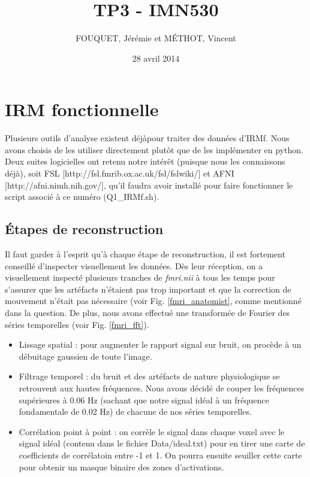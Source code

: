 \documentclass[a4paper]{article}
\title{TP3 - IMN530}
\author{FOUQUET, Jérémie et MÉTHOT, Vincent}
\date{28 avril 2014}
\begin{document}
\maketitle

\section{IRM fonctionnelle}

Plusieurs outils d'analyse existent déjàpour traiter des données d'IRMf. Nous avons choisis de les utiliser directement plutôt que de les implémenter en python. Deux suites logicielles ont retenu notre intérêt (puisque nous les connaissons déjà), soit FSL [http://fsl.fmrib.ox.ac.uk/fsl/fslwiki/] et AFNI [http://afni.nimh.nih.gov/], qu'il faudra avoir installé pour faire fonctionner le script associé à ce numéro (Q1\_IRMf.sh).

\subsection{Étapes de reconstruction}

Il faut garder à l'esprit qu'à chaque étape de reconstruction, il est fortement conseillé d'inspecter visuellement les données. Dès leur réception, on a visuellement inspecté plusieurs tranches de \emph{fmri.nii} à tous les temps pour s'assurer que les artéfacts n'étaient pas trop important et que la correction de mouvement n'était pas nécessaire (voir Fig. \ref{fmri_anatomist}, comme mentionné dans la question. De plus, nous avons effectué une transformée de Fourier des séries temporelles (voir Fig. \ref{fmri_fft}).

\begin{itemize}
	\item Lissage spatial : pour augmenter le rapport signal sur bruit, on procède à un débuitage gaussien de toute l'image.
	\item Filtrage temporel : du bruit et des artéfacts de nature physiologique se retrouvent aux hautes fréquences. Nous avous décidé de couper les fréquences supérieures à 0.06 Hz (sachant que notre signal idéal à un fréquence fondamentale de 0.02 Hz) de chacune de nos séries temporelles. 
	\item Corrélation point à point : on corrèle le signal dans chaque voxel avec le signal idéal (contenu dans le fichier Data/ideal.txt) pour en tirer une carte de coefficients de corrélatoin entre -1 et 1. On pourra ensuite seuiller cette carte pour obtenir un masque binaire des zones d'activations.
\end{itemize}
\end{document}
